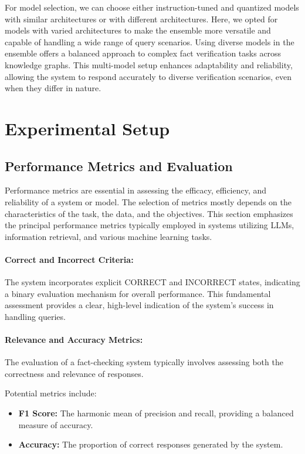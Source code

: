 For model selection, we can choose either instruction-tuned and quantized models with similar architectures or with different architectures.
Here, we opted for models with varied architectures to make the ensemble more versatile and capable of handling a wide range of query scenarios.
Using diverse models in the ensemble offers a balanced approach to complex fact verification tasks across knowledge graphs.
This multi-model setup enhances adaptability and reliability, allowing the system to respond accurately to diverse verification scenarios, even when they differ in nature.

\section{Experimental Setup}\label{sec:empirical-evaluation:experimental-setup}
\subsection{Performance Metrics and Evaluation}\label{subsec:empirical-evaluation:experimental-setup:performance-metrics-and-evaluation}
Performance metrics are essential in assessing the efficacy, efficiency, and reliability of a system or model.
The selection of metrics mostly depends on the characteristics of the task, the data, and the objectives.
This section emphasizes the principal performance metrics typically employed in systems utilizing LLMs, information retrieval, and various machine learning tasks.
\paragraph{Correct and Incorrect Criteria:}
The system incorporates explicit CORRECT and INCORRECT states, indicating a binary evaluation mechanism for overall performance.
This fundamental assessment provides a clear, high-level indication of the system's success in handling queries.
\paragraph{Relevance and Accuracy Metrics:}
The evaluation of a fact-checking system typically involves assessing both the correctness and relevance of responses.

Potential metrics include:
\begin{itemize}
    \item \textbf{F1 Score:} The harmonic mean of precision and recall, providing a balanced measure of accuracy.
    \item \textbf{Accuracy:} The proportion of correct responses generated by the system.
\end{itemize}
